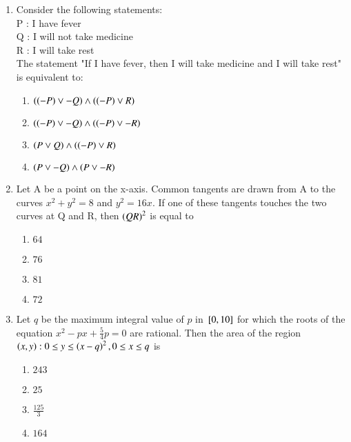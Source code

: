 \documentclass[journal,9pt,onecolumn]{IEEEtran}
\begin{document}
\begin{enumerate}


\item Consider the following statements:\\
P : I have fever\\
Q : I will not take medicine\\
R : I will take rest\\
The statement "If I have fever, then I will take
medicine and I will take rest" is equivalent to:
\begin{multicols}{2}
\begin{enumerate}
    \item $\left(\left(- P\right) \lor - Q\right) \land \left(\left(- P\right) \lor R\right)$
    \item $\left(\left(- P\right) \lor - Q\right) \land \left(\left(- P\right) \lor - R\right)$
    \item $\left(P \lor Q\right) \land \left(\left(- P\right) \lor R\right)$
    \item $\left(P \lor - Q\right) \land \left(P \lor - R\right)$
\end{enumerate}
\end{multicols}

\item Let A be a point on the x-axis. Common tangents are drawn from A to the curves $x^2 + y^2 = 8$ and $y^2 = 16x$. If one of these tangents touches the two curves at Q and R, then $\left(QR\right)^2$ is equal to
\begin{multicols}{4}    
\begin{enumerate}
    \item $64$
    \item $76$
    \item $81$
    \item $72$
\end{enumerate}
\end{multicols}


\item Let $q$ be the maximum integral value of $p$ in ${}\left[0, 10\right]$ for which the roots of the equation $x^2 - px + \frac{5}{4}p = 0$ are rational. Then the area of the region $\left(x, y\right) : 0 \leq y \leq \left(x - q\right)^2, 0 \leq x \leq q$ is
\begin{multicols}{4}    
\begin{enumerate}
    \item $243$
    \item $25$
    \item $\frac{125}{3}$
    \item $164$
\end{enumerate}
\end{multicols}



\end{enumerate}
\end{document}
